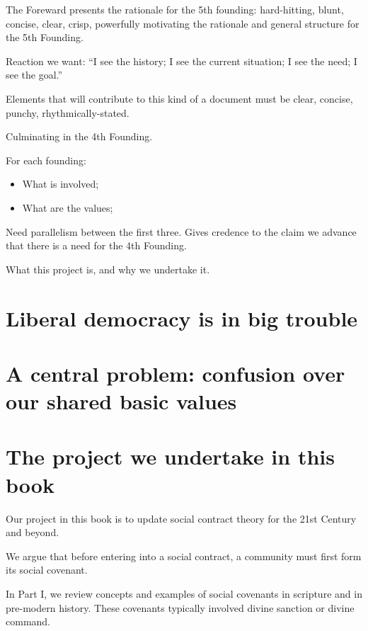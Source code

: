 \documentclass[
]{book}
\providecommand{\tightlist}{%
  \setlength{\itemsep}{0pt}\setlength{\parskip}{0pt}}
\begin{document}
The Foreward presents the rationale for the 5th founding: hard-hitting, blunt, concise, clear, crisp, powerfully motivating the rationale and general structure for the 5th Founding.

Reaction we want: ``I see the history; I see the current situation; I see the need; I see the goal.''

Elements that will contribute to this kind of a document must be clear, concise, punchy, rhythmically-stated.

Culminating in the 4th Founding.

For each founding:

\begin{itemize}
\tightlist
\item
  What is involved;
\item
  What are the values;
\end{itemize}

Need parallelism between the first three. Gives credence to the claim we advance that there is a need for the 4th Founding.

What this project is, and why we undertake it.

\hypertarget{liberal-democracy-is-in-big-trouble}{%
\section{Liberal democracy is in big trouble}\label{liberal-democracy-is-in-big-trouble}}

\hypertarget{a-central-problem-confusion-over-our-shared-basic-values}{%
\section{A central problem: confusion over our shared basic values}\label{a-central-problem-confusion-over-our-shared-basic-values}}

\hypertarget{the-project-we-undertake-in-this-book}{%
\section{The project we undertake in this book}\label{the-project-we-undertake-in-this-book}}

Our project in this book is to update social contract theory for the 21st Century and beyond.

We argue that before entering into a social contract, a community must first form its social covenant.

In Part I, we review concepts and examples of social covenants in scripture and in pre-modern history. These covenants typically involved divine sanction or divine command.
\end{document}
